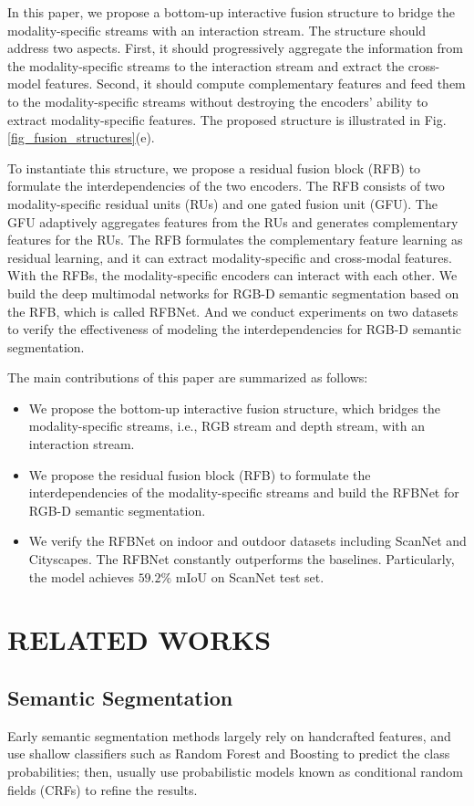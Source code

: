 \documentclass[letterpaper, 10 pt, conference]{ieeeconf}
\begin{document}
	In this paper, we propose a bottom-up interactive fusion structure to bridge the modality-specific streams with an interaction stream. The structure should address two aspects. First, it should progressively aggregate the information from the modality-specific streams to the interaction stream and extract the cross-model features. Second, it should compute complementary features and feed them to the modality-specific streams without destroying the encoders' ability to extract modality-specific features. The proposed structure is illustrated in Fig.\ref{fig_fusion_structures}(e).
	
	To instantiate this structure, we propose a residual fusion block (RFB) to formulate the interdependencies of the two encoders. The RFB consists of two modality-specific residual units (RUs) and one gated fusion unit (GFU). The GFU adaptively aggregates features from the RUs and generates complementary features for the RUs. The RFB formulates the complementary feature learning as residual learning, and it can extract modality-specific and cross-modal features. With the RFBs, the modality-specific encoders can interact with each other. We build the deep multimodal networks for RGB-D semantic segmentation based on the RFB, which is called RFBNet. And we conduct experiments on two datasets to verify the effectiveness of modeling the interdependencies for RGB-D semantic segmentation.
	
	The main contributions of this paper are summarized as follows:
	\begin{itemize}
		\item We propose the bottom-up interactive fusion structure, which bridges the modality-specific streams, i.e., RGB stream and depth stream, with an interaction stream.
		\item We propose the residual fusion block (RFB) to formulate the interdependencies of the modality-specific streams and build the RFBNet for RGB-D semantic segmentation.
		\item We verify the RFBNet on indoor and outdoor datasets including ScanNet\cite{dai2017scannet} and Cityscapes\cite{cordts2016cityscapes}. The RFBNet constantly outperforms the baselines. Particularly, the model achieves $59.2\%$ mIoU on ScanNet test set.
	\end{itemize}
	
	\section{RELATED WORKS}
	\subsection{Semantic Segmentation}
	Early semantic segmentation methods largely rely on handcrafted features, and use shallow classifiers such as Random Forest and Boosting to predict the class probabilities; then, usually use probabilistic models known as conditional random fields (CRFs) to refine the results\cite{muller2014learning,shotton2009textonboost}. 
	
\end{document}
